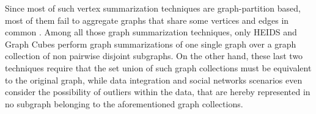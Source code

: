 Since most of such vertex summarization techniques are graph-partition based, most of them fail to aggregate graphs that share some vertices and edges in common \cite{yin,Tian20085,jakawat}. Among all those graph summarization techniques, only HEIDS \cite{ChengJQ16} and Graph Cubes \cite{Zhao11} perform graph summarizations of one single graph over a graph collection of non pairwise disjoint subgraphs. On the other hand, these last two techniques require that the set union of such graph collections must be equivalent to the original graph, while data integration and social networks scenarios even consider the possibility of outliers within the data, that are hereby represented in no subgraph belonging to the aforementioned graph collections. %





